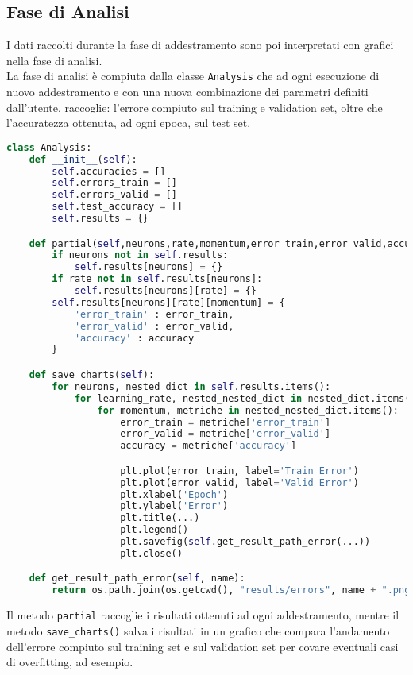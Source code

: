 \subsection{Fase di Analisi}
I dati raccolti durante la fase di addestramento sono poi interpretati con grafici nella fase di analisi. \\
La fase di analisi è compiuta dalla classe \texttt{Analysis} che ad ogni esecuzione di nuovo addestramento e con una nuova combinazione dei parametri definiti dall'utente, raccoglie: l'errore compiuto sul training e validation set, oltre che l'accuratezza ottenuta, ad ogni epoca, sul test set. \\
\begin{lstlisting}[language=Python]
class Analysis:
    def __init__(self):
        self.accuracies = []
        self.errors_train = []
        self.errors_valid = []
        self.test_accuracy = []
        self.results = {}

    def partial(self,neurons,rate,momentum,error_train,error_valid,accuracy):
        if neurons not in self.results:
            self.results[neurons] = {}
        if rate not in self.results[neurons]:
            self.results[neurons][rate] = {}
        self.results[neurons][rate][momentum] = {
            'error_train' : error_train,
            'error_valid' : error_valid,
            'accuracy' : accuracy
        }

    def save_charts(self):
        for neurons, nested_dict in self.results.items():
            for learning_rate, nested_nested_dict in nested_dict.items():
                for momentum, metriche in nested_nested_dict.items():
                    error_train = metriche['error_train']
                    error_valid = metriche['error_valid']
                    accuracy = metriche['accuracy']

                    plt.plot(error_train, label='Train Error')
                    plt.plot(error_valid, label='Valid Error')
                    plt.xlabel('Epoch')
                    plt.ylabel('Error')
                    plt.title(...)
                    plt.legend()
                    plt.savefig(self.get_result_path_error(...))
                    plt.close()

    def get_result_path_error(self, name):
        return os.path.join(os.getcwd(), "results/errors", name + ".png")
\end{lstlisting}
Il metodo \texttt{partial} raccoglie i risultati ottenuti ad ogni addestramento, mentre il metodo \texttt{save\_charts()} salva i risultati in un grafico che compara l'andamento dell'errore compiuto sul training set e sul validation set per covare eventuali casi di overfitting, ad esempio.